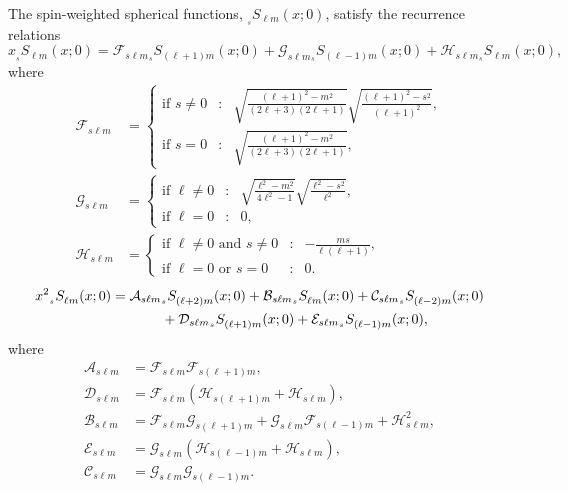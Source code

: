 \documentclass[11pt]{article}
\newcommand{\swS}[5][]{{}_{{}_{#2}}S^{#1}_{#3}(#4;#5)}
\begin{document}
The spin-weighted spherical functions, $\swS{s}{\ell{m}}{x}{0}$, 
satisfy the recurrence relations
\begin{equation}\label{eqn:swS:xrecur}
  x \swS{s}{\ell{m}}{x}{0} = 
       \mathcal{F}_{s\ell{m}} \swS{s}{(\ell+1){m}}{x}{0}
       + \mathcal{G}_{s\ell{m}} \swS{s}{(\ell-1){m}}{x}{0}
       + \mathcal{H}_{s\ell{m}} \swS{s}{\ell{m}}{x}{0},
\end{equation}
where
\begin{align}
  \label{eqn:x1coefF}
  \mathcal{F}_{s\ell{m}} &= \left\{\begin{array}{rcl}
       \mbox{if\ }s\ne0 &:& 
       \sqrt{\frac{(\ell+1)^2-m^2}{(2\ell+3)(2\ell+1)}}
       \sqrt{\frac{(\ell+1)^2-s^2}{(\ell+1)^2}}, \\
       \mbox{if\ }s=0 &:& 
       \sqrt{\frac{(\ell+1)^2-m^2}{(2\ell+3)(2\ell+1)}},
       \end{array}\right. \\
  \label{eqn:x1coefG}
  \mathcal{G}_{s\ell{m}} &= \left\{\begin{array}{rcl}
       \mbox{if\ }\ell\ne0 &:& 
       \sqrt{\frac{\ell^2-m^2}{4\ell^2-1}}
       \sqrt{\frac{\ell^2-s^2}{\ell^2}}, \\
       \mbox{if\ }\ell=0 &:& 0, 
       \end{array}\right. \\
  \label{eqn:x1coefH}
  \mathcal{H}_{s\ell{m}} &= \left\{\begin{array}{rcl}
       \mbox{if\ }\ell\ne0 \mbox{\ and\ } s\ne0 &:& 
       -\frac{ms}{\ell(\ell+1)}, \\
       \mbox{if\ }\ell=0 \mbox{\ or\ } s=0 &:& 0.
       \end{array}\right.
\end{align}
\begin{align}\label{eqn:swS:x2recur}
  x^2 \swS{s}{\ell{m}}{x}{0} &= 
       \mathcal{A}_{s\ell{m}} \swS{s}{(\ell+2){m}}{x}{0}
       + \mathcal{B}_{s\ell{m}} \swS{s}{\ell{m}}{x}{0}
       + \mathcal{C}_{s\ell{m}} \swS{s}{(\ell-2){m}}{x}{0} \nonumber \\
       &{}\hspace{0.5in}
       + \mathcal{D}_{s\ell{m}} \swS{s}{(\ell+1){m}}{x}{0}
       + \mathcal{E}_{s\ell{m}} \swS{s}{(\ell-1){m}}{x}{0},
\end{align}
where
\begin{align}\label{eqn:x2coefA}
  \mathcal{A}_{s\ell{m}} &= \mathcal{F}_{s\ell{m}}\mathcal{F}_{s(\ell+1)m}, \\
  \label{eqn:x2coefD}
  \mathcal{D}_{s\ell{m}} &= \mathcal{F}_{s\ell{m}}
         (\mathcal{H}_{s(\ell+1)m} + \mathcal{H}_{s\ell{m}}) , \\
  \label{eqn:x2coefB}
  \mathcal{B}_{s\ell{m}} &= \mathcal{F}_{s\ell{m}}\mathcal{G}_{s(\ell+1)m}
     + \mathcal{G}_{s\ell{m}}\mathcal{F}_{s(\ell-1)m} 
     + \mathcal{H}^2_{s\ell{m}}, \\
  \label{eqn:x2coefE}
  \mathcal{E}_{s\ell{m}} &= \mathcal{G}_{s\ell{m}}
         (\mathcal{H}_{s(\ell-1)m} + \mathcal{H}_{s\ell{m}}) , \\
  \label{eqn:x2coefC}
  \mathcal{C}_{s\ell{m}} &= \mathcal{G}_{s\ell{m}}\mathcal{G}_{s(\ell-1)m}.
\end{align}
\end{document}
